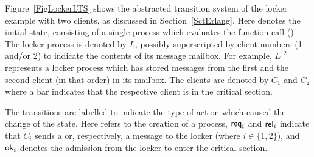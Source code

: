 \documentclass{entcs}
\begin{document}
Figure~\ref{FigLockerLTS} shows the abstracted transition system of the locker
example with two clients, as discussed in Section~\ref{SctErlang}. Here
 denotes the initial state, consisting of a single process which
evaluates the function call (). The locker process
is denoted by $L$, possibly superscripted by client numbers (1 and/or 2) to
indicate the contents of its message mailbox. For example, $L^{12}$ represents
a locker process which has stored  messages from the first and
the second client (in that order) in its mailbox. The clients are denoted by
$C_1$ and $C_2$ where a bar indicates that the respective client is in the
critical section.

The transitions are labelled to indicate the type of action which caused the
change of the state. Here  refers to the creation of a process,
$\key{req}_i$ and $\key{rel}_i$ indicate that $C_i$ sends a 
or, respectively, a  message to the locker (where $i \in \{1,
2\}$), and $\key{ok}_i$ denotes the admission from the locker to enter the
critical section.
\end{document}
